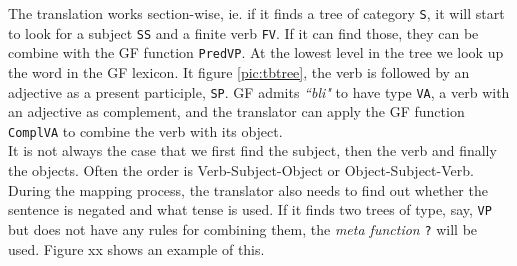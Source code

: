 \documentclass{report}
\begin{document}

The translation works section-wise, ie. if it finds a tree of category \verb|S|,
it will start to look for a subject \verb|SS| and a finite verb \verb|FV|. If it
can find those, they can be combine with the GF function \verb|PredVP|.
At the lowest level in the tree we look up the word in the GF lexicon.
It figure \ref{pic:tbtree}, the verb is followed by an adjective as a present
participle, \verb|SP|. GF admits \emph{``bli"} to have type \verb|VA|, a verb
with an adjective as complement, and the translator can apply the GF function
\verb|ComplVA| to combine the verb with its object. \\
It is not always the case that we first find the subject, then the verb and 
finally the objects. Often the order is Verb-Subject-Object or Object-Subject-Verb. \\
During the mapping process, the translator also needs to find out whether the sentence is
negated and what tense is used. If it finds two trees of type, say, \verb|VP| but does not
have any rules for combining them, the \textit{meta function} \verb-?- will be used. 
Figure xx shows an example of this.\\


\end{document}
